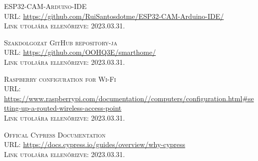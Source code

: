 \documentclass[
]{thesis-ekf}
\theoremstyle{definition}
\theoremstyle{remark}
\begin{document}
\begin{thebibliography}{20}
		\textsc{ESP32-CAM-Arduino-IDE}\\
		\textsc{URL:} \url{https://github.com/RuiSantosdotme/ESP32-CAM-Arduino-IDE/}\\
		\textsc{Link utoljára ellenőrizve:} 2023.03.31.
		
		\textsc{Szakdolgozat GitHub repository-ja}\\
		\textsc{URL:} \url{https://github.com/OOHQ3E/smarthome/}\\
		\textsc{Link utoljára ellenőrizve:} 2023.03.31.
		
		\textsc{Raspberry configuration for Wi-Fi}\\
		\textsc{URL:} \url{https://www.raspberrypi.com/documentation//computers/configuration.html#setting-up-a-routed-wireless-access-point}\\
		\textsc{Link utoljára ellenőrizve:} 2023.03.31.
	
		\textsc{Offical Cypress Documentation}\\
		\textsc{URL:} \url{https://docs.cypress.io/guides/overview/why-cypress}\\
		\textsc{Link utoljára ellenőrizve:} 2023.03.31.
				
	\end{thebibliography}
	
	
\end{document}
